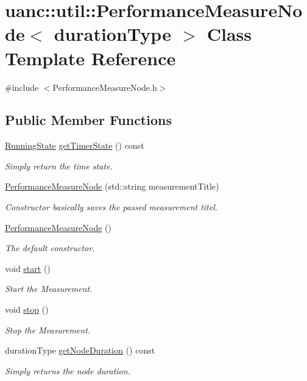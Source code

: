 \hypertarget{classuanc_1_1util_1_1_performance_measure_node}{}\section{uanc\+:\+:util\+:\+:Performance\+Measure\+Node$<$ duration\+Type $>$ Class Template Reference}
\label{classuanc_1_1util_1_1_performance_measure_node}


{\ttfamily \#include $<$Performance\+Measure\+Node.\+h$>$}

\subsection*{Public Member Functions}
\begin{DoxyCompactItemize}
\item 
\hyperlink{namespaceuanc_1_1util_a1327e6c853ec100096ba39559392affd}{Running\+State} \hyperlink{classuanc_1_1util_1_1_performance_measure_node_ac3bffb3fbe98084515e36054f6aa734c}{get\+Timer\+State} () const 
\begin{DoxyCompactList}\small\item\em Simply return the time state. \end{DoxyCompactList}\item 
\hyperlink{classuanc_1_1util_1_1_performance_measure_node_a9d95ba2bd78adc3a94408ab7a617cec4}{Performance\+Measure\+Node} (std\+::string measurement\+Title)
\begin{DoxyCompactList}\small\item\em Constructor basically saves the passed measurement titel. \end{DoxyCompactList}\item 
\hyperlink{classuanc_1_1util_1_1_performance_measure_node_ae0c28da21ea63503d9ec54de2ffcba8a}{Performance\+Measure\+Node} ()
\begin{DoxyCompactList}\small\item\em The default constructor. \end{DoxyCompactList}\item 
void \hyperlink{classuanc_1_1util_1_1_performance_measure_node_af650b94015d87472e558fa1f48591bcc}{start} ()
\begin{DoxyCompactList}\small\item\em Start the Measurement. \end{DoxyCompactList}\item 
void \hyperlink{classuanc_1_1util_1_1_performance_measure_node_aff3fedae5b6e11bc0c88ff8692dae14c}{stop} ()
\begin{DoxyCompactList}\small\item\em Stop the Measurement. \end{DoxyCompactList}\item 
duration\+Type \hyperlink{classuanc_1_1util_1_1_performance_measure_node_acb24e9f5bc4b722a69c0688900eb93ec}{get\+Node\+Duration} () const 
\begin{DoxyCompactList}\small\item\em Simply returns the node duration. \end{DoxyCompactList}\end{DoxyCompactItemize}
